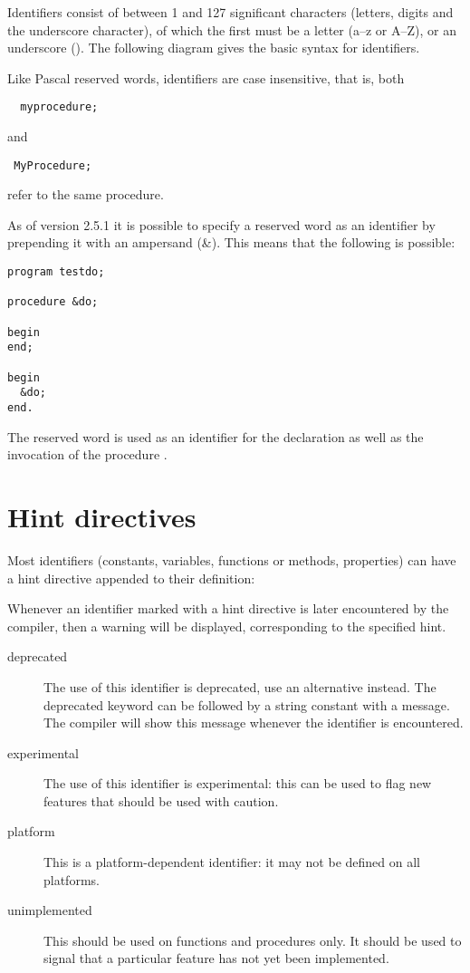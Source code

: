 Identifiers consist of between 1 and 127 significant characters (letters, digits and
the underscore character), of which the first must be a letter (a--z or A--Z),
or an underscore (\var{\_}).
The following diagram gives the basic syntax for identifiers.

Like Pascal reserved words, identifiers are case insensitive, that is, both
\begin{verbatim}
  myprocedure;
\end{verbatim}
and
\begin{verbatim}
 MyProcedure;
\end{verbatim}
refer to the same procedure.

\begin{remark}
As of version 2.5.1 it is possible to specify a reserved word as an identifier by
prepending it with an ampersand (\&). This means that the following is possible:
\begin{verbatim}
program testdo;

procedure &do;

begin
end;

begin
  &do;
end.
\end{verbatim}
The reserved word  is used as an identifier for the declaration as
well as the invocation of the procedure .
\end{remark}

\section{Hint directives}
Most identifiers (constants, variables, functions or methods, properties) can have a
hint directive appended to their definition:


Whenever an identifier marked with a hint directive is  later encountered by
the compiler, then a warning will be displayed, corresponding to the
specified hint.
\begin{description}
\item[deprecated] The use of this identifier is deprecated, use an
alternative instead. The deprecated keyword can be followed by a string
constant with a message. The compiler will show this message whenever the
identifier is encountered. 
\item[experimental] The use of this identifier is experimental: this can be
used to flag new features that should be used with caution.
\item[platform] This is a platform-dependent identifier: it may not be
defined on all platforms. 
\item[unimplemented] This should be used on functions and procedures only.
It should be used to signal that a particular feature has not yet been
implemented. 
\end{description}

